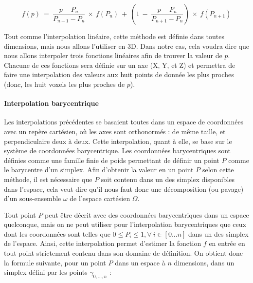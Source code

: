 {{{{{					$$f(p)~=~\frac{p-P_n}{P_{n+1}-P_n}~\times~f(P_n)~+~(1~-~\frac{p-P_n}{P_{n+1}-P_n})~\times~f(P_{n+1})$$


					Tout comme l'interpolation linéaire, cette méthode est définie dans toutes dimensions, mais nous allons l'utiliser en 3D. Dans notre cas, cela voudra dire que nous allons interpoler trois fonctions linéaires afin de trouver la valeur de $p$. Chacune de ces fonctions sera définie sur un axe (X, Y, et Z) et permettra de faire une interpolation des valeurs aux huit points de donnée les plus proches (donc, les huit voxels les plus proches de $p$).\par

				}

				\paragraph*{Interpolation barycentrique}
				{
					\par
					Les interpolations précédentes se basaient toutes dans un espace de coordonnées avec un repère cartésien, où les axes sont orthonormés : de même taille, et perpendiculaire deux à deux. Cette interpolation, quant à elle, se base sur le système de coordonnées barycentrique. Les coordonnées barycentriques sont définies comme une famille finie de poids permettant de définir un point $P$ comme le barycentre d'un simplex. Afin d'obtenir la valeur en un point $P$ selon cette méthode, il est nécessaire que $P$ soit contenu dans un des simplex disponibles dans l'espace, cela veut dire qu'il nous faut donc une décomposition (ou pavage) d'un sous-ensemble $\omega$ de l'espace cartésien $\Omega$.\par

					\par

					Tout point $P$ peut être décrit avec des coordonnées barycentriques dans un espace quelconque, mais on ne peut utiliser pour l'interpolation barycentriques que ceux dont les coordonnées sont telles que $0 \leq P_i \leq 1, \forall~i \in [0 ... n]$ dans un des simplex de l'espace. Ainsi, cette interpolation permet d'estimer la fonction $f$ en entrée en tout point strictement contenu dans son domaine de définition. On obtient donc la formule suivante, pour un point $P$ dans un espace à $n$ dimensions, dans un simplex défini par les points $\gamma_{0, ..., n}$ :\\

}}}}}
